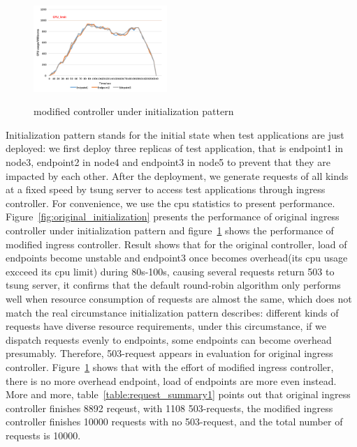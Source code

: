 \begin{figure}[!htb]
 \centering
 \includegraphics[width=0.45\textwidth]{images/data2.png}\\
 \caption{modified controller under initialization pattern}
 \label{fig:modified_initialization}
\end{figure}

Initialization pattern stands for the initial state when test applications are just deployed: we first deploy three replicas of test application, that is endpoint1 in node3, endpoint2 in node4 and endpoint3 in node5
to prevent that they are impacted by each other. After the deployment, we generate requests of all kinds at a fixed speed by tsung server to access test applications through ingress controller.
For convenience, we use the cpu statistics to present performance. Figure~\ref{fig:original_initialization} presents the performance of original ingress controller under initialization pattern and
figure~{\ref{fig:modified_initialization}} shows the performance of modified ingress controller. Result shows that for the original controller, load of endpoints become unstable and endpoint3 once becomes overhead(its cpu usage excceed its cpu limit) during 80s-100s, causing several
requests return 503 to tsung server, it confirms that the default round-robin algorithm only performs well when resource consumption of requests are almost the same, which does not match the real circumstance initialization pattern describes: different kinds of requests have diverse
resource requirements, under this circumstance, if we dispatch requests evenly to endpoints, some endpoints can become overhead presumably. Therefore, 503-request appears in evaluation for original ingress controller. Figure~{\ref{fig:modified_initialization}} shows that
with the effort of modified ingress controller, there is no more overhead endpoint, load of endpoints are more even instead. More and more, table~{\ref{table:request_summary1}} points out that original ingress controller finishes 8892 reqeust, with 1108 503-requests, the
modified ingress controller finishes 10000 requests with no 503-request, and the total number of requests is 10000.

